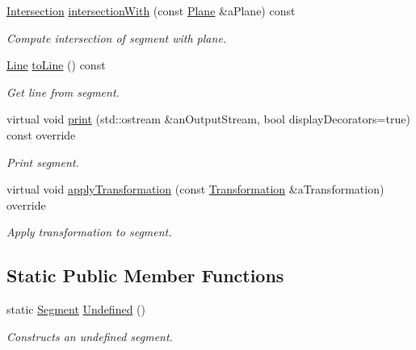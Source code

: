 \begin{DoxyCompactItemize}
\hyperlink{classostk_1_1math_1_1geom_1_1d3_1_1_intersection}{Intersection} \hyperlink{classostk_1_1math_1_1geom_1_1d3_1_1objects_1_1_segment_a0a2acca7fc6eb6d957a33381ab8bc6b1}{intersection\+With} (const \hyperlink{classostk_1_1math_1_1geom_1_1d3_1_1objects_1_1_plane}{Plane} \&a\+Plane) const
\begin{DoxyCompactList}\small\item\em Compute intersection of segment with plane. \end{DoxyCompactList}\item 
\hyperlink{classostk_1_1math_1_1geom_1_1d3_1_1objects_1_1_line}{Line} \hyperlink{classostk_1_1math_1_1geom_1_1d3_1_1objects_1_1_segment_a6f9e4f9c67f62d357fae8320dab8d48b}{to\+Line} () const
\begin{DoxyCompactList}\small\item\em Get line from segment. \end{DoxyCompactList}\item 
virtual void \hyperlink{classostk_1_1math_1_1geom_1_1d3_1_1objects_1_1_segment_a2c2029b6b84e984532f98dbd9a10ff1b}{print} (std\+::ostream \&an\+Output\+Stream, bool display\+Decorators=true) const override
\begin{DoxyCompactList}\small\item\em Print segment. \end{DoxyCompactList}\item 
virtual void \hyperlink{classostk_1_1math_1_1geom_1_1d3_1_1objects_1_1_segment_a5d2aba754d42c89224c7579944de9c4f}{apply\+Transformation} (const \hyperlink{classostk_1_1math_1_1geom_1_1d3_1_1_transformation}{Transformation} \&a\+Transformation) override
\begin{DoxyCompactList}\small\item\em Apply transformation to segment. \end{DoxyCompactList}\end{DoxyCompactItemize}
\subsection*{Static Public Member Functions}
\begin{DoxyCompactItemize}
\item 
static \hyperlink{classostk_1_1math_1_1geom_1_1d3_1_1objects_1_1_segment}{Segment} \hyperlink{classostk_1_1math_1_1geom_1_1d3_1_1objects_1_1_segment_a488c219e6e6a137981df83b9d247f2bf}{Undefined} ()
\begin{DoxyCompactList}\small\item\em Constructs an undefined segment. \end{DoxyCompactList}\end{DoxyCompactItemize}


